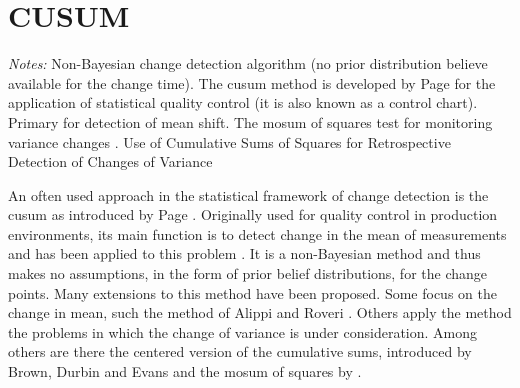 \section{CUSUM}\label{sec:cusum}




\emph{Notes:}
Non-Bayesian change detection algorithm (\ie no prior distribution believe available for the change time).
The \gls{cusum} method is developed by Page \cite{page1954continuous} for the application of statistical quality control (it is also known as a control chart).
Primary for detection of mean shift.
The \gls{mosum} of squares test for monitoring variance changes \cite{hsu2007mosum}.
Use of Cumulative Sums of Squares for Retrospective Detection of Changes of Variance \cite{inclan1994use}

An often used approach in the statistical framework of change detection is the \gls{cusum} as introduced by Page \cite{page1954continuous}.
Originally used for quality control in production environments, its main function is to detect change in the mean of measurements and has been applied to this problem \cite{basseville1993detection}.
It is a non-Bayesian method and thus makes no assumptions, in the form of prior belief distributions, for the change points.
Many extensions to this method have been proposed.
Some focus on the change in mean, such the method of Alippi and Roveri \cite{alippi2006adaptive}.
Others apply the method the problems in which the change of variance is under consideration.
Among others are there the centered version of the cumulative sums, introduced by Brown, Durbin and Evans \cite{brown1975techniques} and the \gls{mosum} of squares by \cite{hsu2007mosum}.

